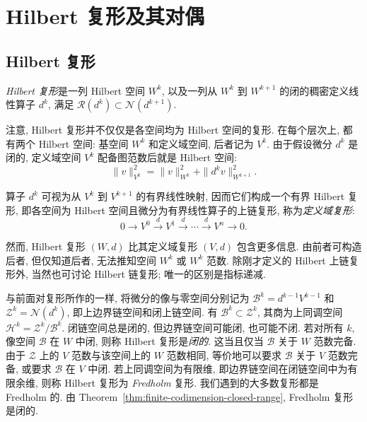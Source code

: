 \section{Hilbert 复形及其对偶}\label{sec:hilbert-complexes-duals}

\subsection{Hilbert 复形}\label{subsec:hilbert-complexes-definition}

\begin{Definition}\label{def:hilbert-complex}
\emph{Hilbert 复形}是一列 Hilbert 空间 $W^k$, 以及一列从 $W^k$ 到 $W^{k+1}$ 的闭的稠密定义线性算子 $d^k$, 满足 $\mathcal R(d^k)\subset\mathcal N(d^{k+1})$.
\end{Definition}

注意, Hilbert 复形并不仅仅是各空间均为 Hilbert 空间的复形. 在每个层次上, 都有两个 Hilbert 空间: 基空间 $W^k$ 和定义域空间, 后者记为 $V^k$. 由于假设微分 $d^k$ 是闭的, 定义域空间 $V^k$ 配备图范数后就是 Hilbert 空间:
\[
\|v\|_{V^k}^2=\|v\|_{W^k}^2+\|d^k v\|_{W^{k+1}}^2.
\]

算子 $d^k$ 可视为从 $V^k$ 到 $V^{k+1}$ 的有界线性映射, 因而它们构成一个有界 Hilbert 复形, 即各空间为 Hilbert 空间且微分为有界线性算子的上链复形, 称为\emph{定义域复形}:
\begin{equation}\label{eq:hilbert-domain-complex}
0\to V^0\xrightarrow{d}V^1\xrightarrow{d}\cdots\xrightarrow{d}V^n\to0.
\end{equation}

然而, Hilbert 复形 $(W,d)$ 比其定义域复形 $(V,d)$ 包含更多信息. 由前者可构造后者, 但仅知道后者, 无法推知空间 $W^k$ 或 $W^k$ 范数. 除刚才定义的 Hilbert 上链复形外, 当然也可讨论 Hilbert 链复形; 唯一的区别是指标递减.

与前面对复形所作的一样, 将微分的像与零空间分别记为 $\mathcal B^k=d^{k-1}V^{k-1}$ 和 $\mathcal Z^k=\mathcal N(d^k)$, 即上边界链空间和闭上链空间. 有 $\mathcal B^k\subset\mathcal Z^k$, 其商为上同调空间 $\mathcal H^k=\mathcal Z^k/\mathcal B^k$. 闭链空间总是闭的, 但边界链空间可能闭, 也可能不闭. 若对所有 $k$, 像空间 $\mathcal B$ 在 $W$ 中闭, 则称 Hilbert 复形是\emph{闭的}. 这当且仅当 $\mathcal B$ 关于 $W$ 范数完备. 由于 $\mathcal Z$ 上的 $V$ 范数与该空间上的 $W$ 范数相同, 等价地可以要求 $\mathcal B$ 关于 $V$ 范数完备, 或要求 $\mathcal B$ 在 $V$ 中闭. 若上同调空间为有限维, 即边界链空间在闭链空间中为有限余维, 则称 Hilbert 复形为 \emph{Fredholm} 复形. 我们遇到的大多数复形都是 Fredholm 的. 由 Theorem~\ref{thm:finite-codimension-closed-range}, Fredholm 复形是闭的.

